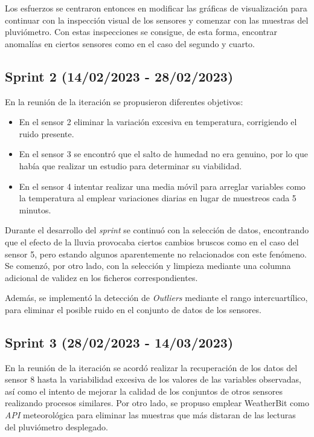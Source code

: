 Los esfuerzos se centraron entonces en modificar las gráficas de visualización para continuar con la inspección visual de los sensores 
y comenzar con las muestras del pluviómetro.
Con estas inspecciones se consigue, de esta forma, encontrar anomalías en ciertos sensores como en el caso del segundo y cuarto.

\subsection{Sprint 2 (14/02/2023 - 28/02/2023)}
En la reunión de la iteración se propusieron diferentes objetivos:
\begin{itemize}
    \item En el sensor 2 eliminar la variación excesiva en temperatura, corrigiendo el ruido presente.
    \item En el sensor 3 se encontró que el salto de humedad no era genuino, por lo que había que realizar un estudio para determinar su viabilidad.
    \item En el sensor 4 intentar realizar una media móvil para arreglar variables como la temperatura al emplear variaciones diarias en lugar de 
        muestreos cada 5 minutos.
\end{itemize}

Durante el desarrollo del \textit{sprint} se continuó con la selección de datos, encontrando que el efecto de la lluvia provocaba ciertos cambios 
bruscos como en el caso del sensor 5, pero estando algunos aparentemente no relacionados con este fenómeno.
Se comenzó, por otro lado, con la selección y limpieza mediante una columna adicional de validez en los ficheros correspondientes.

Además, se implementó la detección de \textit{Outliers} mediante el rango intercuartílico, para eliminar el posible ruido en el conjunto de datos
de los sensores.

\subsection{Sprint 3 (28/02/2023 - 14/03/2023)}
En la reunión de la iteración se acordó realizar la recuperación de los datos del sensor 8 hasta la variabilidad excesiva de los valores de las
variables observadas, así como el intento de mejorar la calidad de los conjuntos de otros sensores realizando procesos similares.
Por otro lado, se propuso emplear WeatherBit como \textit{API} meteorológica para eliminar las muestras que más distaran de las lecturas del 
pluviómetro desplegado.

